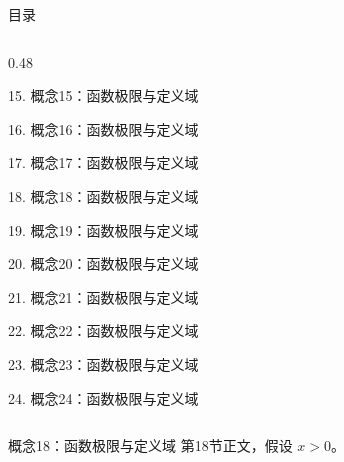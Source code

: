 \documentclass[aspectratio=169,10pt,fontset=fandol]{ctexbeamer}
\begin{document}
\begin{frame}[t,fragile]{目录}
\begin{columns}[T,onlytextwidth]
\begin{column}{0.48\textwidth}
{\color{black}\small 15. 概念15：函数极限与定义域\par}\vspace{0.22em}
{\color{black}\small 16. 概念16：函数极限与定义域\par}\vspace{0.22em}
{\color{black}\small 17. 概念17：函数极限与定义域\par}\vspace{0.22em}
{\color{blue}\small 18. 概念18：函数极限与定义域\par}\vspace{0.22em}
{\color{gray!40}\small 19. 概念19：函数极限与定义域\par}\vspace{0.22em}
{\color{gray!40}\small 20. 概念20：函数极限与定义域\par}\vspace{0.22em}
{\color{gray!40}\small 21. 概念21：函数极限与定义域\par}\vspace{0.22em}
{\color{gray!40}\small 22. 概念22：函数极限与定义域\par}\vspace{0.22em}
{\color{gray!40}\small 23. 概念23：函数极限与定义域\par}\vspace{0.22em}
{\color{gray!40}\small 24. 概念24：函数极限与定义域\par}\vspace{0.22em}
\end{column}
\end{columns}
\end{frame}
\begin{frame}[t,fragile]{概念18：函数极限与定义域}
\normalsize
{\normalsize
第18节正文，假设 $x>0$。
}
\end{frame}
\end{document}
